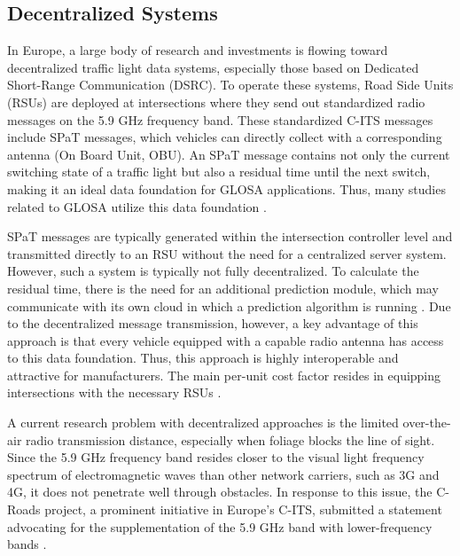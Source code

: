 \subsection{Decentralized Systems}

In Europe, a large body of research and investments is flowing toward decentralized traffic light data systems, especially those based on Dedicated Short-Range Communication (DSRC). To operate these systems, Road Side Units (RSUs) are deployed at intersections where they send out standardized radio messages on the 5.9 GHz frequency band. These standardized C-ITS messages include SPaT messages, which vehicles can directly collect with a corresponding antenna (On Board Unit, OBU). An SPaT message contains not only the current switching state of a traffic light but also a residual time until the next switch, making it an ideal data foundation for GLOSA applications. Thus, many studies related to GLOSA utilize this data foundation \cite{schweiger_elisatm_2011, rakha_eco-driving_2011, rakha_aeris_2012, li_open_2012, suramardhana_driver-centric_2014, xu_bb_2015, bernais_design_2016, nguyen_efficient_2016, choudhury_integrated_2016, stahlmann_multi-hop_2017, stahlmann_exploring_2018, plianos_predictive_2018, zhang_green_2020, chen_developing_2022}.

SPaT messages are typically generated within the intersection controller level \cite{zweck_traffic_2013} and transmitted directly to an RSU without the need for a centralized server system. However, such a system is typically not fully decentralized. To calculate the residual time, there is the need for an additional prediction module, which may communicate with its own cloud in which a prediction algorithm is running \cite{strobl_c-its_2019, neuner_leitfaden_2020}. Due to the decentralized message transmission, however, a key advantage of this approach is that every vehicle equipped with a capable radio antenna has access to this data foundation. Thus, this approach is highly interoperable and attractive for manufacturers. The main per-unit cost factor resides in equipping intersections with the necessary RSUs \cite{niebel_cost-benefit-based_2013}.

A current research problem with decentralized approaches is the limited over-the-air radio transmission distance, especially when foliage blocks the line of sight. Since the 5.9 GHz frequency band resides closer to the visual light frequency spectrum of electromagnetic waves than other network carriers, such as 3G and 4G, it does not penetrate well through obstacles.  In response to this issue, the C-Roads project, a prominent initiative in Europe's C-ITS, submitted a statement advocating for the supplementation of the 5.9 GHz band with lower-frequency bands \cite{bohm_radio_2017}.

